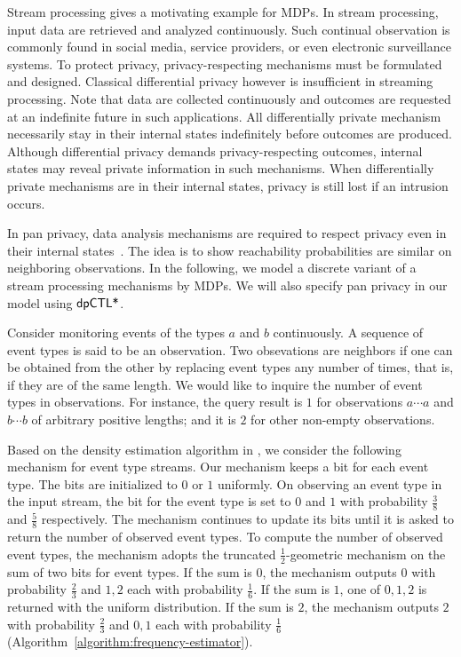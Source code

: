 
Stream processing gives a motivating example for MDPs. In stream 
processing, input data are retrieved and
analyzed continuously. Such continual observation is commonly found
in social media, service providers, or even electronic surveillance
systems. To protect privacy, privacy-respecting mechanisms must be
formulated and designed. Classical differential privacy however is
insufficient in streaming processing. Note that data are collected
continuously and outcomes are requested at an indefinite future
in such applications. All differentially private
mechanism necessarily stay in their internal states indefinitely
before outcomes are produced. Although differential privacy demands
privacy-respecting outcomes, internal states may reveal private
information in such mechanisms. When differentially private mechanisms
are in their internal states, privacy is still lost if an intrusion
occurs.

In pan privacy, data analysis mechanisms are required to respect
privacy even in their internal states~\cite{DNPR:10:DPCO,DNPRY:10:PPSA}.
The idea is to show reachability probabilities are similar on
neighboring observations. In the following, we model a discrete
variant of a stream processing mechanisms by MDPs. We will also
specify pan privacy in our model using $\textsf{dpCTL*}$.

Consider monitoring events of the types $a$ and $b$ continuously.
A sequence of event types is said to be an observation. Two
obsevations are {neighbors} if one can be obtained from the other
by replacing event types any number of times, that is, if they are of
the same length. %
We would like to inquire the number of event types in
observations. For instance, the query result is $1$
for observations $a \cdots a$ and $b \cdots b$ of arbitrary positive
lengths; and it is $2$ for other non-empty observations.

Based on the density estimation algorithm in \cite{DNPRY:10:PPSA}, we
consider the following mechanism for event type streams. Our mechanism
keeps a bit for each event type. The bits are initialized to $0$ or
$1$ uniformly. On observing an event type in the input stream, the
bit for the event type is set to $0$ and $1$ with probability
$\frac{3}{8}$ and $\frac{5}{8}$ respectively. The mechanism continues
to update its bits until it is asked to return the number of observed
event types. To compute the number of observed event types, the
mechanism adopts the truncated $\frac{1}{2}$-geometric mechanism on the sum of
two bits for event types. If the sum is $0$, the mechanism outputs $0$
with probability $\frac{2}{3}$ and $1, 2$ each with probability
$\frac{1}{6}$. If the sum is $1$, one of $0, 1, 2$ is returned with
the uniform distribution. If the sum is $2$, the mechanism outputs $2$
with probability $\frac{2}{3}$ and $0, 1$ each with probability
$\frac{1}{6}$ (Algorithm~\ref{algorithm:frequency-estimator}).

